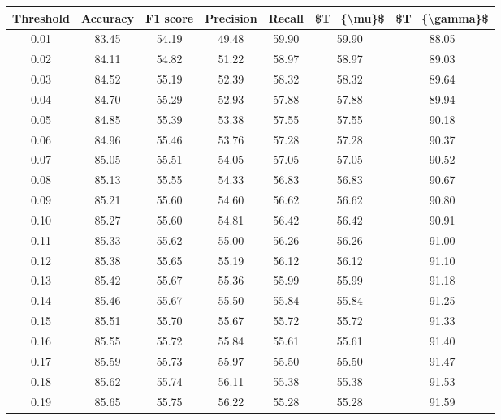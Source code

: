 \begin{tabular}{|c|c|c|c|c|c|c|}
\hline
 Threshold &  Accuracy &  F1 score &  Precision &  Recall &  \$T\_\{\textbackslash mu\}\$ &  \$T\_\{\textbackslash gamma\}\$ \\
\hline
      0.01 &     83.45 &     54.19 &      49.48 &   59.90 &      59.90 &         88.05 \\
      0.02 &     84.11 &     54.82 &      51.22 &   58.97 &      58.97 &         89.03 \\
      0.03 &     84.52 &     55.19 &      52.39 &   58.32 &      58.32 &         89.64 \\
      0.04 &     84.70 &     55.29 &      52.93 &   57.88 &      57.88 &         89.94 \\
      0.05 &     84.85 &     55.39 &      53.38 &   57.55 &      57.55 &         90.18 \\
      0.06 &     84.96 &     55.46 &      53.76 &   57.28 &      57.28 &         90.37 \\
      0.07 &     85.05 &     55.51 &      54.05 &   57.05 &      57.05 &         90.52 \\
      0.08 &     85.13 &     55.55 &      54.33 &   56.83 &      56.83 &         90.67 \\
      0.09 &     85.21 &     55.60 &      54.60 &   56.62 &      56.62 &         90.80 \\
      0.10 &     85.27 &     55.60 &      54.81 &   56.42 &      56.42 &         90.91 \\
      0.11 &     85.33 &     55.62 &      55.00 &   56.26 &      56.26 &         91.00 \\
      0.12 &     85.38 &     55.65 &      55.19 &   56.12 &      56.12 &         91.10 \\
      0.13 &     85.42 &     55.67 &      55.36 &   55.99 &      55.99 &         91.18 \\
      0.14 &     85.46 &     55.67 &      55.50 &   55.84 &      55.84 &         91.25 \\
      0.15 &     85.51 &     55.70 &      55.67 &   55.72 &      55.72 &         91.33 \\
      0.16 &     85.55 &     55.72 &      55.84 &   55.61 &      55.61 &         91.40 \\
      0.17 &     85.59 &     55.73 &      55.97 &   55.50 &      55.50 &         91.47 \\
      0.18 &     85.62 &     55.74 &      56.11 &   55.38 &      55.38 &         91.53 \\
      0.19 &     85.65 &     55.75 &      56.22 &   55.28 &      55.28 &         91.59 \\

\end{tabular}
